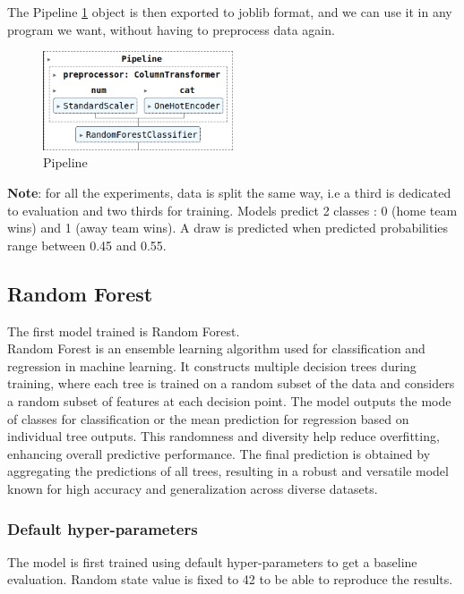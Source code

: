 \documentclass[a4paper,12pt]{article}
\begin{document}
The Pipeline \ref{fig:pipeline} object is then exported to joblib format, and we can use it in any program we want, without having to preprocess data again.\\

\begin{figure}[H]
  \centering
  \includegraphics[width=0.5\textwidth]{./images/pipeline.png}
  \caption{Pipeline}
  \label{fig:pipeline}
\end{figure}

\textbf{Note}: for all the experiments, data is split the same way, i.e a third is dedicated to evaluation and two thirds for training. Models predict 2 classes : 0 (home team wins) and 1 (away team wins). A draw is predicted when predicted probabilities range between 0.45 and 0.55.
\subsection{Random Forest}

The first model trained is Random Forest.\\

Random Forest is an ensemble learning algorithm used for classification and regression in machine learning. It constructs multiple decision trees during training, where each tree is trained on a random subset of the data and considers a random subset of features at each decision point. The model outputs the mode of classes for classification or the mean prediction for regression based on individual tree outputs. This randomness and diversity help reduce overfitting, enhancing overall predictive performance. The final prediction is obtained by aggregating the predictions of all trees, resulting in a robust and versatile model known for high accuracy and generalization across diverse datasets.\\

\subsubsection{Default hyper-parameters}

The model is first trained using default hyper-parameters to get a baseline evaluation. Random state value is fixed to 42 to be able to reproduce the results.\\
\end{document}
